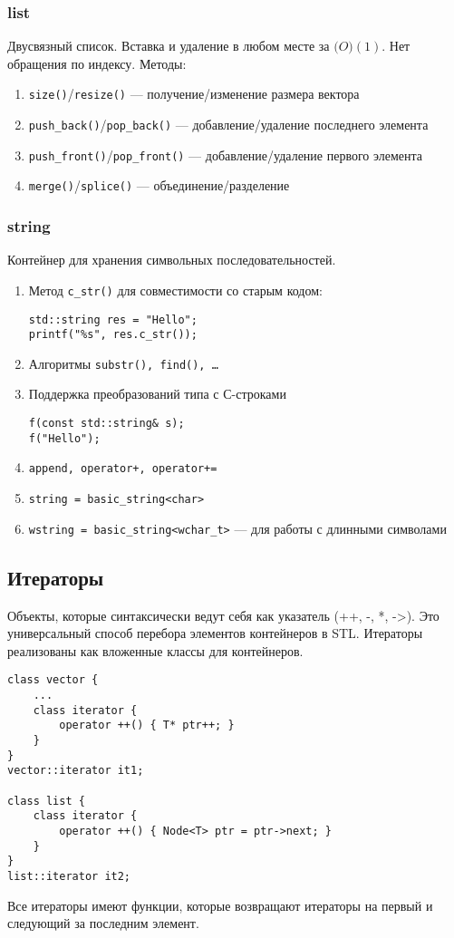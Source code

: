 \subsubsection{list}
Двусвязный список. Вставка и удаление в любом месте за $ \mathcal(O)(1)$. Нет обращения по индексу.
Методы:
 \begin{enumerate}[noitemsep]
	\item \texttt{size()}/\texttt{resize()} --- получение/изменение размера вектора
	\item \texttt{push\_back()}/\texttt{pop\_back()} --- добавление/удаление последнего элемента
	\item \texttt{push\_front()}/\texttt{pop\_front()} --- добавление/удаление первого элемента
	\item \texttt{merge()}/\texttt{splice()} --- объединение/разделение 
\end{enumerate} 
\subsubsection{string}
Контейнер для хранения символьных последовательностей.
\begin{enumerate}[noitemsep]
	\item Метод \texttt{c\_str()} для совместимости со старым кодом:
		\begin{verbatim}
std::string res = "Hello";
printf("%s", res.c_str());
		\end{verbatim}
	\item Алгоритмы \texttt{substr(), find(), \ldots }
	\item Поддержка преобразований типа с С-строками
		\begin{verbatim}
f(const std::string& s);
f("Hello");
		\end{verbatim}
	\item \texttt{append, operator+, operator+=}
	\item \texttt{string = basic\_string<char>} 
	\item \texttt{wstring = basic\_string<wchar\_t>} --- для работы с длинными символами
\end{enumerate} 
\subsection{Итераторы}
Объекты, которые синтаксически ведут себя как указатель (++, -, *, ->). Это универсальный способ перебора элементов контейнеров в STL. Итераторы реализованы как вложенные классы для контейнеров.
\begin{verbatim}
class vector {
	...
	class iterator {
	    operator ++() { T* ptr++; }
	}
}
vector::iterator it1;

class list {
    class iterator {
		operator ++() { Node<T> ptr = ptr->next; }
	}
}
list::iterator it2;
\end{verbatim}
Все итераторы имеют функции, которые возвращают итераторы на первый и следующий за последним элемент.

